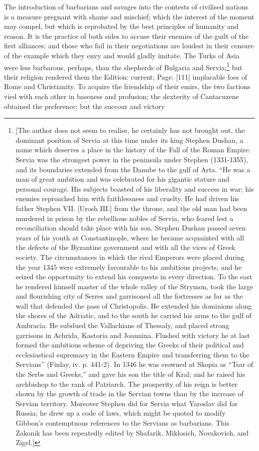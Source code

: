 The introduction of barbarians and savages into the contests of civilised nations is a measure pregnant with shame and mischief; which the interest of the moment may compel, but which is reprobated by the best principles of humanity and reason. It is the practice of both sides to accuse their enemies of the guilt of the first alliances; and those who fail in their negotiations are loudest in their censure of the example which they envy and would gladly imitate. The Turks of Asia were less barbarous, perhaps, than the shepherds of Bulgaria and Servia;\footnote{[The author does not seem to realise, he certainly has not brought out, the dominant position of Servia at this time under its king Stephen Dushan, a name which deserves a place in the history of the Fall of the Roman Empire. Servia was the strongest power in the peninsula under Stephen (1331-1355), and its boundaries extended from the Danube to the gulf of Arta. \texthebrew{“}He was a man of great ambition and was celebrated for his gigantic stature and personal courage. His subjects boasted of his liberality and success in war; his enemies reproached him with faithlessness and cruelty. He had driven his father Stephen VII. [Urosh III.] from the throne, and the old man had been murdered in prison by the rebellious nobles of Servia, who feared lest a reconciliation should take place with his son. Stephen Dushan passed seven years of his youth at Constantinople, where he became acquainted with all the defects of the Byzantine government and with all the vices of Greek society. The circumstances in which the rival Emperors were placed during the year 1345 were extremely favourable to his ambitious projects, and he seized the opportunity to extend his conquests in every direction. To the east he rendered himself master of the whole valley of the Strymon, took the large and flourishing city of Serres and garrisoned all the fortresses as far as the wall that defended the pass of Christopolis. He extended his dominions along the shores of the Adriatic, and to the south he carried his arms to the gulf of Ambracia. He subdued the Vallachians of Thessaly, and placed strong garrisons in Achrida, Kastoria and Joannina. Flushed with victory he at last formed the ambitious scheme of depriving the Greeks of their political and ecclesiastical supremacy in the Eastern Empire and transferring them to the Servians\texthebrew{}” (Finlay, iv. p. 441-2). In 1346 he was crowned at Skopia as \texthebrew{“}Tsar of the Serbs and Greeks,\texthebrew{}” and gave his son the title of Kral; and he raised his archbishop to the rank of Patriarch. The prosperity of his reign is better shown by the growth of trade in the Servian towns than by the increase of Servian territory. Moreover Stephen did for Servia what Yaroslav did for Russia; he drew up a code of laws, which might be quoted to modify Gibbon\texthebrew{}’s contemptuous references to the Servians as barbarians. This Zakonik has been repeatedly edited by Shafarik, Miklosich, Novakovich, and Zigel.]} but their religion rendered them the Edition: current; Page: [111] implacable foes of Rome and Christianity. To acquire the friendship of their emirs, the two factions vied with each other in baseness and profusion; the dexterity of Cantacuzene obtained the preference; but the succour and victory 